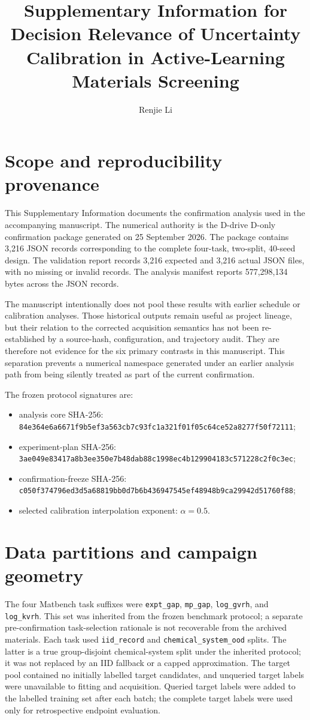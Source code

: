 \documentclass[11pt]{article}
\title{Supplementary Information for\\
Decision Relevance of Uncertainty Calibration in Active-Learning Materials Screening}
\author{Renjie Li}
\date{}
\newcommand{\code}[1]{\texttt{#1}}
\begin{document}
\maketitle
\sloppy

\section{Scope and reproducibility provenance}
This Supplementary Information documents the confirmation analysis used in the accompanying manuscript. The numerical authority is the D-drive D-only confirmation package generated on 25 September 2026. The package contains 3,216 JSON records corresponding to the complete four-task, two-split, 40-seed design. The validation report records 3,216 expected and 3,216 actual JSON files, with no missing or invalid records. The analysis manifest reports 577,298,134 bytes across the JSON records.

The manuscript intentionally does not pool these results with earlier schedule or calibration analyses. Those historical outputs remain useful as project lineage, but their relation to the corrected acquisition semantics has not been re-established by a source-hash, configuration, and trajectory audit. They are therefore not evidence for the six primary contrasts in this manuscript. This separation prevents a numerical namespace generated under an earlier analysis path from being silently treated as part of the current confirmation.

The frozen protocol signatures are:
\begin{itemize}[leftmargin=*]
\item analysis core SHA-256: {\scriptsize\texttt{84e364e6a6671f9b5ef3a563cb7c93fc1a321f01f05c64ce52a8277f50f72111}};
\item experiment-plan SHA-256: {\scriptsize\texttt{3ae049e83417a8b3ee350e7b48dab88c1998ec4b129904183c571228c2f0c3ec}};
\item confirmation-freeze SHA-256: {\scriptsize\texttt{c050f374796ed3d5a68819bb0d7b6b436947545ef48948b9ca29942d51760f88}};
\item selected calibration interpolation exponent: \(\alpha=0.5\).
\end{itemize}

\section{Data partitions and campaign geometry}
The four Matbench task suffixes were \code{expt\_gap}, \code{mp\_gap}, \code{log\_gvrh}, and \code{log\_kvrh}. This set was inherited from the frozen benchmark protocol; a separate pre-confirmation task-selection rationale is not recoverable from the archived materials. Each task used \code{iid\_record} and \code{chemical\_system\_ood} splits. The latter is a true group-disjoint chemical-system split under the inherited protocol; it was not replaced by an IID fallback or a capped approximation. The target pool contained no initially labelled target candidates, and unqueried target labels were unavailable to fitting and acquisition. Queried target labels were added to the labelled training set after each batch; the complete target labels were used only for retrospective endpoint evaluation.
\end{document}
